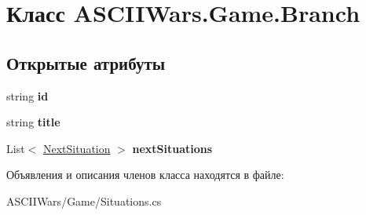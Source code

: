 \hypertarget{class_a_s_c_i_i_wars_1_1_game_1_1_branch}{}\section{Класс A\+S\+C\+I\+I\+Wars.\+Game.\+Branch}
\label{class_a_s_c_i_i_wars_1_1_game_1_1_branch}
\subsection*{Открытые атрибуты}
\begin{DoxyCompactItemize}
\item 
\hypertarget{class_a_s_c_i_i_wars_1_1_game_1_1_branch_a1282f409f0d3f4920253079ed5f2ba3c}{}\label{class_a_s_c_i_i_wars_1_1_game_1_1_branch_a1282f409f0d3f4920253079ed5f2ba3c} 
string {\bfseries id}
\item 
\hypertarget{class_a_s_c_i_i_wars_1_1_game_1_1_branch_aa1a7fc6d8ff84881ecea850ef481616d}{}\label{class_a_s_c_i_i_wars_1_1_game_1_1_branch_aa1a7fc6d8ff84881ecea850ef481616d} 
string {\bfseries title}
\item 
\hypertarget{class_a_s_c_i_i_wars_1_1_game_1_1_branch_a1f68675102e4e66e210874145273522c}{}\label{class_a_s_c_i_i_wars_1_1_game_1_1_branch_a1f68675102e4e66e210874145273522c} 
List$<$ \hyperlink{class_a_s_c_i_i_wars_1_1_game_1_1_next_situation}{Next\+Situation} $>$ {\bfseries next\+Situations}
\end{DoxyCompactItemize}


Объявления и описания членов класса находятся в файле\+:\begin{DoxyCompactItemize}
\item 
A\+S\+C\+I\+I\+Wars/\+Game/Situations.\+cs\end{DoxyCompactItemize}
